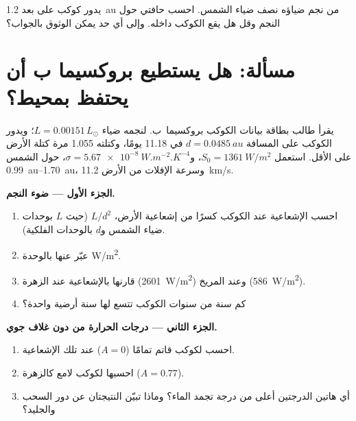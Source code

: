 \begin{exercise}[$\star\star\star$]\label{exo:g10:habitable-planet:15}
يدور كوكب على بعد \qty{1.2}{au} من نجم ضياؤه نصف ضياء الشمس.
احسب حافتي  حول النجم وقل هل يقع الكوكب داخله. وإلى أي
حد يمكن الوثوق بالجواب؟
\end{exercise}

\section{مسألة: هل يستطيع بروكسيما ب أن يحتفظ بمحيط؟}

\begin{problem}
\label{pb:g10:habitable-planet:1}
يقرأ طالب بطاقة بيانات الكوكب بروكسيما~ب. لنجمه ضياء
$L = 0.00151\,L_\odot$؛ ويدور الكوكب على المسافة $d = \qty{0.0485}{au}$
في 11.18 يومًا، وكتلته 1.055 مرة كتلة الأرض على الأقل. استعمل
$S_0 = \qty{1361}{W/m^2}$، و$\sigma = \qty{5.67e-8}{W.m^{-2}.K^{-4}}$،  حول الشمس \qtyrange{0.99}{1.70}{au}، وسرعة الإفلات من الأرض
\qty{11.2}{km/s}.

\medskip
\noindent\textbf{الجزء الأول --- ضوء النجم.}
\begin{enumerate}
  \item احسب الإشعاعية عند الكوكب كسرًا من إشعاعية الأرض،
        $L/d^2$ (حيث $L$ بوحدات ضياء الشمس و$d$ بالوحدات الفلكية).
  \item عبّر عنها بالوحدة \unit{W/m^2}.
  \item قارنها بالإشعاعية عند الزهرة (\qty{2601}{W/m^2}) وعند
        المريخ (\qty{586}{W/m^2}).
  \item كم سنة من سنوات الكوكب تتسع لها سنة أرضية واحدة؟
\end{enumerate}

\medskip
\noindent\textbf{الجزء الثاني --- درجات الحرارة من دون غلاف جوي.}
\begin{enumerate}[resume]
  \item احسب  لكوكب قاتم تمامًا
        ($A = 0$) عند تلك الإشعاعية.
  \item احسبها لكوكب لامع كالزهرة ($A = 0.77$).
  \item أي هاتين الدرجتين أعلى من درجة تجمد الماء؟ وماذا تبيّن النتيجتان عن دور
        السحب والجليد؟
\end{enumerate}


\end{problem}
